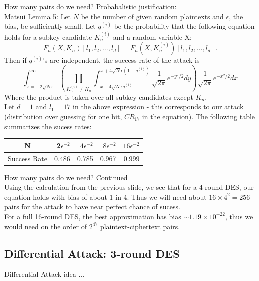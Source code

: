 \documentclass[9pt]{beamer}
\begin{document}
\begin{frame}
How many pairs do we need? Probabalistic justification:\\
\vspace{3mm}
Matsui Lemma 5: Let $N$ be the number of given random plaintexts and $\epsilon$, the bias, be sufficiently small. Let $q^{(i)}$ be the probability that the following equation holds for a subkey candidate $K_n^{(i)}$ and a random variable X:
\[ F_n(X,K_n)[l_1, l_2,\dots,l_d] = F_n(X, K_n^{(i)})[l_1, l_2, \dots, l_d].\]
Then if $q^{(i)}$'s are independent, the success rate of the attack is
\[ \int_{x=-2\sqrt{N}\epsilon}^\infty \left( \prod_{K_n^{(i)} \neq K_n} \int_{-x-4\sqrt{N}\epsilon q^{(i)}}^{x+4\sqrt{N}\epsilon (1 - q^{(i)})} \frac{1}{\sqrt{2\pi}} e^{-y^2/2} dy \right) \frac{1}{\sqrt{2\pi}} e^{-x^2/2} dx \]
Where the product is taken over all subkey candidates except $K_n$.\\
\vspace{3mm}
Let $d = 1$ and $l_1 = 17$ in the above expression - this corresponds to our attack (distribution over guessing for one bit, $CR_{17}$ in the equation). The following table summarizes the sucess rates:
\begin{center}
\begin{tabular}{|c|r|r|r|r|}
\hline
N & 2$\epsilon^{-2}$ & $4\epsilon^{-2}$ & $8\epsilon^{-2}$ & $16\epsilon^{-2}$ \\
\hline
Success Rate & 0.486 & 0.785 & 0.967 & 0.999 \\
\hline
\end{tabular} 
\end{center}
\end{frame}

\begin{frame}
How many pairs do we need? Continued\\
\vspace{3mm}
Using the calculation from the previous slide, we see that for a 4-round DES, our equation holds with bias of about 1 in 4. Thus we will need about $16\times 4^2 = 256$ pairs for the attack to have near perfect chance of sucess.\\
\vspace{3mm}
For a full 16-round DES, the best approximation has bias $\sim 1.19\times 10^{-22}$, thus we would need on the order of $2^{47}$ plaintext-ciphertext pairs.
\end{frame}

\subsection{Differential Attack: 3-round DES}
\begin{frame}
Differential Attack idea ...

\end{frame}
\end{document}
